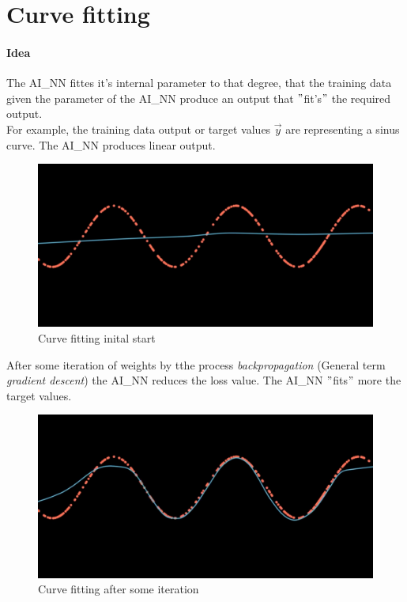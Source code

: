 

\section{Curve fitting}

\paragraph{Idea}
The \gls{AI_NN} fittes it's internal parameter to that degree, that the training data given the parameter of the \gls{AI_NN} produce an output that $"$fit's$"$ the required output.\\

For example, the training data output or target values $\vec{y}$ are representing a sinus curve. The \gls{AI_NN} produces linear output.
\begin{figure}[H]
	\centering
	\includegraphics[scale = 0.2]{attachment/chapter_AML/Scc032}
	\caption{Curve fitting inital start}
\end{figure}

After some iteration of weights by tthe process \textit{backpropagation} (General term  \textit{gradient descent}) the \gls{AI_NN} reduces the loss value. 
The \gls{AI_NN} $"$fits$"$ more the target values.
\begin{figure}[H]
	\centering
	\includegraphics[scale = 0.2]{attachment/chapter_AML/Scc033}
	\caption{Curve fitting after some iteration}
\end{figure}


